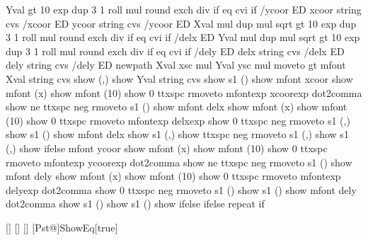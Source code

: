 {{{     Yval \psk@decimals{} gt
     { 10 \psk@decimals\space exp dup 3 1 roll mul round exch div } if
     \psk@decimals{} eq {cvi} if /ycoor ED
     xcoor \psk@valuewidth\space string cvs /xcoor ED
     ycoor \psk@valuewidth\space string cvs /ycoor ED
     \psk@relxerr\space Xval mul dup mul sqrt
     \psk@decimals{} gt
     { 10   \psk@decimals\space exp dup 3 1 roll mul round exch div } if
     \psk@decimals{} eq {cvi} if /delx ED
     \psk@relyerr\space Yval mul dup mul sqrt
     \psk@decimals{} gt
     { 10   \psk@decimals\space exp dup 3 1 roll mul round exch div } if
     \psk@decimals{} eq {cvi} if /dely ED
     delx \psk@valuewidth\space string cvs /delx ED
     dely \psk@valuewidth\space string cvs /dely ED
   \fi
%    
     newpath
     Xval xsc mul %
     Yval ysc mul %
     moveto
     \Pst@Debug{} gt {
     mfont
     Xval \psk@valuewidth\space string cvs show (,) show
     Yval \psk@valuewidth\space string cvs show }
     {s1 (\string{}) show 
     mfont xcoor show
       \ifPst@science
       mfont (x) show
       mfont (10) show
       0 ttxspc rmoveto mfontexp xcoorexp \ifPst@comma\space dot2comma \fi show
       \fi
     \psk@relxerr{} ne
     {  ttxspc neg rmoveto s1 (\string{}) show
       mfont delx show
       mfont (x) show
       mfont (10) show
       0 ttxspc rmoveto mfontexp delxexp show
       0 ttxspc neg rmoveto s1 (,) show
       \else
       s1 (\string{}) show
       mfont delx show
       s1 (,) show
       \fi }
     {  ttxspc neg rmoveto s1 (,) show
       \else
       s1 (,) show
       \fi } ifelse
     mfont ycoor show
       \ifPst@science
       mfont (x) show
       mfont (10) show
       0 ttxspc rmoveto mfontexp ycoorexp \ifPst@comma\space dot2comma \fi show
       \fi
     \psk@relyerr{} ne
     {  ttxspc neg rmoveto s1 (\string{}) show
       mfont dely show
       mfont (x) show
       mfont (10) show
       0 ttxspc rmoveto mfontexp delyexp \ifPst@comma\space dot2comma \fi show
       0 ttxspc neg rmoveto s1 (\string{}) show
       \else
       s1 (\string{}) show
       mfont dely \ifPst@comma\space dot2comma \fi show
       s1 (\string{}) show
       \fi }
       { s1 (\string{}) show } ifelse } ifelse
 } repeat } if }

[{}]{\def\psk@EqPos{#1}}
[{}]{\def\psk@MaPos{#1}}%
[{}]{\def\psk@MaScale{#1}}%
[Pst@]{ShowEq}[true]{}%

